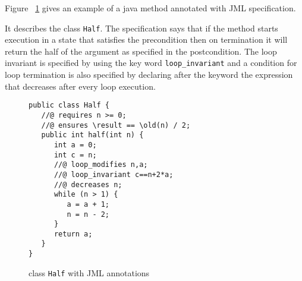 Figure ~\ref{halfSrc} gives an example of a java method annotated with JML specification.

It describes the class \texttt{Half}.
The specification says that if the method starts execution in a state that satisfies the precondition then on termination it will return the half of the argument as specified in the postcondition. The loop invariant is specified by using the key word \texttt{loop\_invariant} and a condition for loop termination is also specified by declaring after the keyword  the expression that decreases after every loop execution. 
\begin{figure}
\begin{verbatim}
public class Half {	
   //@ requires n >= 0;
   //@ ensures \result == \old(n) / 2; 	 
   public int half(int n) {
      int a = 0;
      int c = n;
      //@ loop_modifies n,a;
      //@ loop_invariant c==n+2*a;
      //@ decreases n;
      while (n > 1) {
         a = a + 1;
         n = n - 2;
      }
      return a;
   }
} 
\end{verbatim}
\caption{class \texttt{Half} with JML annotations} 
\label{halfSrc}
\end{figure}

